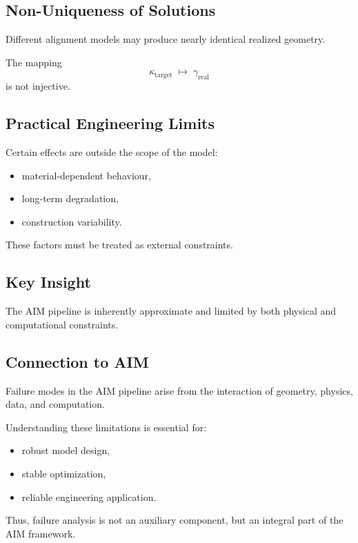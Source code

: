 \subsection{Non-Uniqueness of Solutions}

Different alignment models may produce nearly identical realized
geometry.

\begin{proposition}
The mapping
\[
\kappa_{\mathrm{target}}
\;\mapsto\;
\gamma_{\mathrm{real}}
\]
is not injective.
\end{proposition}


\subsection{Practical Engineering Limits}

Certain effects are outside the scope of the model:
\begin{itemize}
\item material-dependent behaviour,
\item long-term degradation,
\item construction variability.
\end{itemize}

These factors must be treated as external constraints.


\subsection{Key Insight}

\begin{proposition}
The AIM pipeline is inherently approximate and limited by both physical
and computational constraints.
\end{proposition}


\subsection{Connection to AIM}

\begin{summary}
Failure modes in the AIM pipeline arise from the interaction of geometry,
physics, data, and computation.

Understanding these limitations is essential for:
\begin{itemize}
\item robust model design,
\item stable optimization,
\item reliable engineering application.
\end{itemize}

Thus, failure analysis is not an auxiliary component, but an integral
part of the AIM framework.
\end{summary}

